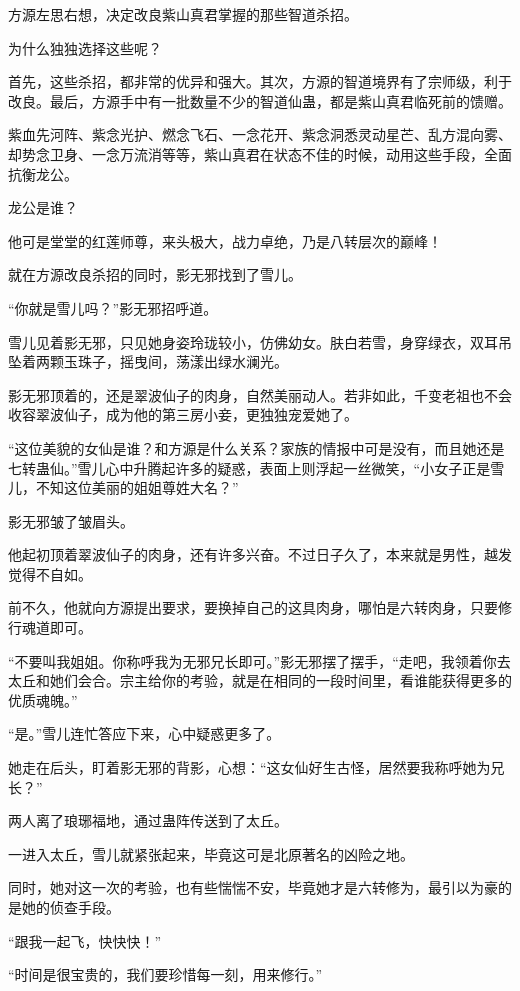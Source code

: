 \begin{this_body}
方源左思右想，决定改良紫山真君掌握的那些智道杀招。

为什么独独选择这些呢？

首先，这些杀招，都非常的优异和强大。其次，方源的智道境界有了宗师级，利于改良。最后，方源手中有一批数量不少的智道仙蛊，都是紫山真君临死前的馈赠。

紫血先河阵、紫念光护、燃念飞石、一念花开、紫念洞悉灵动星芒、乱方混向雾、却势念卫身、一念万流消等等，紫山真君在状态不佳的时候，动用这些手段，全面抗衡龙公。

龙公是谁？

他可是堂堂的红莲师尊，来头极大，战力卓绝，乃是八转层次的巅峰！

就在方源改良杀招的同时，影无邪找到了雪儿。

“你就是雪儿吗？”影无邪招呼道。

雪儿见着影无邪，只见她身姿玲珑较小，仿佛幼女。肤白若雪，身穿绿衣，双耳吊坠着两颗玉珠子，摇曳间，荡漾出绿水澜光。

影无邪顶着的，还是翠波仙子的肉身，自然美丽动人。若非如此，千变老祖也不会收容翠波仙子，成为他的第三房小妾，更独独宠爱她了。

“这位美貌的女仙是谁？和方源是什么关系？家族的情报中可是没有，而且她还是七转蛊仙。”雪儿心中升腾起许多的疑惑，表面上则浮起一丝微笑，“小女子正是雪儿，不知这位美丽的姐姐尊姓大名？”

影无邪皱了皱眉头。

他起初顶着翠波仙子的肉身，还有许多兴奋。不过日子久了，本来就是男性，越发觉得不自如。

前不久，他就向方源提出要求，要换掉自己的这具肉身，哪怕是六转肉身，只要修行魂道即可。

“不要叫我姐姐。你称呼我为无邪兄长即可。”影无邪摆了摆手，“走吧，我领着你去太丘和她们会合。宗主给你的考验，就是在相同的一段时间里，看谁能获得更多的优质魂魄。”

“是。”雪儿连忙答应下来，心中疑惑更多了。

她走在后头，盯着影无邪的背影，心想：“这女仙好生古怪，居然要我称呼她为兄长？”

两人离了琅琊福地，通过蛊阵传送到了太丘。

一进入太丘，雪儿就紧张起来，毕竟这可是北原著名的凶险之地。

同时，她对这一次的考验，也有些惴惴不安，毕竟她才是六转修为，最引以为豪的是她的侦查手段。

“跟我一起飞，快快快！”

“时间是很宝贵的，我们要珍惜每一刻，用来修行。”


\end{this_body}

